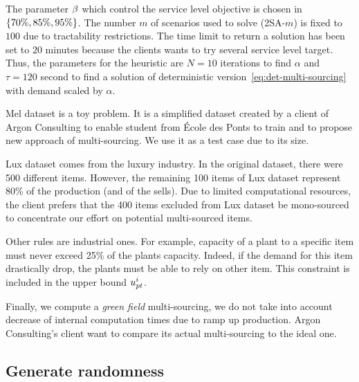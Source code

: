 The parameter $\beta$ which control the service level objective is chosen in $\crbracket{70\%,85\%,95\%}$.
The number $m$ of scenarios used to solve (2SA-$m$) is fixed to $100$ due to tractability restrictions.
The time limit to return a solution has been set to $20$ minutes because the clients wants to try several service level target.
Thus, the parameters for the heuristic are $N=10$ iterations to find $\alpha$ and $\tau=120$ second to find a solution of deterministic version~\eqref{eq:det-multi-sourcing} with demand scaled by $\alpha$.


\medskip


Mel dataset is a toy problem.
It is a simplified dataset created by a client of Argon Consulting to enable student from \'Ecole des Ponts to train and to propose new approach of multi-sourcing.
We use it as a test case due to its size.


\medskip


Lux dataset comes from the luxury industry.
In the original dataset, there were 500 different items.
However, the remaining 100 items of Lux dataset represent 80\% of the production (and of the sells).
Due to limited computational resources, the client prefers that the 400 items excluded from Lux dataset be mono-sourced to concentrate our effort on potential multi-sourced items.


Other rules are industrial ones.
For example, capacity of a plant to a specific item must never exceed 25\% of the plants capacity.
Indeed, if the demand for this item drastically drop, the plants must be able to rely on other item.
This constraint is included in the upper bound $u_{pt}^i$.


Finally, we compute a \emph{green field} multi-sourcing, \ie we do not take into account decrease of internal computation times due to ramp up production.
Argon Consulting's client want to compare its actual multi-sourcing to the ideal one.


\subsection{Generate randomness}
\label{sec:multi-sourcing:numerical-experiments:generate-randomness}



